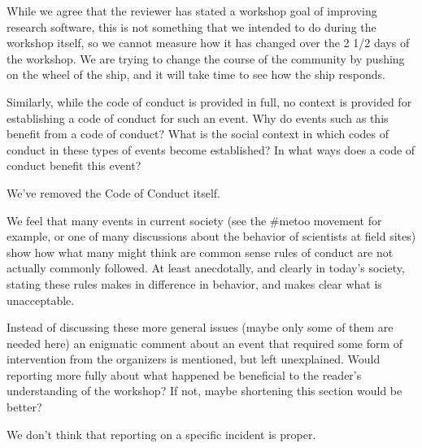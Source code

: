 \documentclass[11pt]{article}
\begin{document}
While we agree that the reviewer has stated a workshop goal of improving research software, this is not something that we intended to do during the workshop itself, so we cannot measure how it has changed over the 2 1/2 days of the workshop.  We are trying to change the course of the community by pushing on the wheel of the ship, and it will take time to see how the ship responds.
\begin{quoting}

Similarly, while the code of conduct is provided in full, no context is provided for establishing a code of conduct for such an event. Why do events such as this benefit from a code of conduct? What is the social context in which codes of conduct in these types of events become established? In what ways does a code of conduct benefit this event?

\end{quoting}
We've removed the Code of Conduct itself.

We feel that many events in current society (see the \#metoo movement for example, or one of many discussions about the behavior of scientists at field sites) show how what many might think are common sense rules of conduct are not actually commonly followed.  At least anecdotally, and clearly in today's society, stating these rules makes in difference in behavior, and makes clear what is unacceptable.
\begin{quoting}

Instead of discussing these more general issues (maybe only some of them are needed here) an enigmatic comment about an event that required some form of intervention from the organizers is mentioned, but left unexplained. Would reporting more fully about what happened be beneficial to the reader's understanding of the workshop? If not, maybe shortening this section would be better?
 
\end{quoting}
 
We don't think that reporting on a specific incident is proper.
 
\end{document}
